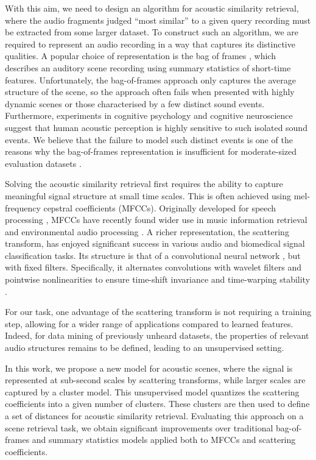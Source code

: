 \documentclass[smallextended]{svjour3}
\begin{document}
With this aim, we need to design an algorithm for acoustic similarity retrieval, where the audio fragments judged ``most similar'' to a given query recording must be extracted from some larger dataset. To construct such an algorithm, we are required to represent an audio recording in a way that captures its distinctive qualities. A popular choice of representation is the bag of frames \cite{aucouturier2007bag}, which describes an auditory scene recording using summary statistics of short-time features. Unfortunately, the bag-of-frames approach only captures the average structure of the scene, so the approach often fails when presented with highly dynamic scenes or those characterised by a few distinct sound events. Furthermore, experiments in cognitive psychology \cite{dubois2006cognitive} and cognitive neuroscience \cite{nelken2004processing} suggest that human acoustic perception is highly sensitive to such isolated sound events. We believe that the failure to model such distinct events is one of the reasons why the bag-of-frames representation is insufficient for moderate-sized evaluation datasets \cite{lagrange:hal-01082501}.

Solving the acoustic similarity retrieval first requires the ability to capture meaningful signal structure at small time scales.
This is often achieved using mel-frequency cepstral coefficients (MFCCs).
Originally developed for speech processing \cite{davis-mermelstein}, MFCCs have recently found wider use in music information retrieval \cite{logan} and environmental audio processing \cite{aucouturier2007bag}.
A richer representation, the scattering transform, has enjoyed significant success in various audio \cite{Anden2014} and biomedical \cite{chudacek} signal classification tasks.
Its structure is that of a convolutional neural network \cite{lee,lostanlen-deep-spiral,soundnet,arandjelovic-zisserman}, but with fixed filters.
Specifically, it alternates convolutions with wavelet filters and pointwise nonlinearities to ensure time-shift invariance and time-warping stability \cite{Mallat2012}.

For our task, one advantage of the scattering transform is not requiring a training step, allowing for a wider range of applications compared to learned features. Indeed, for data mining of previously unheard datasets, the properties of relevant audio structures remains to be defined, leading to an unsupervised setting.

In this work, we propose a new model for acoustic scenes, where the signal is represented at sub-second scales by scattering transforms, while larger scales are captured by a cluster model. This unsupervised model quantizes the scattering coefficients into a given number of clusters. These clusters are then used to define a set of distances for acoustic similarity retrieval. Evaluating this approach on a scene retrieval task, we obtain significant improvements over traditional bag-of-frames and summary statistics models applied both to MFCCs and scattering coefficients.
\end{document}

